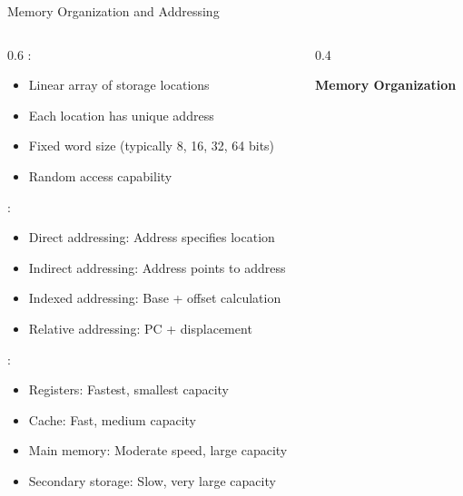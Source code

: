 \begin{frame}{Memory Organization and Addressing}
\begin{columns}
\begin{column}{0.6\textwidth}
:
\begin{itemize}
\item Linear array of storage locations
\item Each location has unique address
\item Fixed word size (typically 8, 16, 32, 64 bits)
\item Random access capability
\end{itemize}

\vspace{0.3cm}
:
\begin{itemize}
\item Direct addressing: Address specifies location
\item Indirect addressing: Address points to address
\item Indexed addressing: Base + offset calculation
\item Relative addressing: PC + displacement
\end{itemize}

\vspace{0.3cm}
:
\begin{itemize}
\item Registers: Fastest, smallest capacity
\item Cache: Fast, medium capacity
\item Main memory: Moderate speed, large capacity
\item Secondary storage: Slow, very large capacity
\end{itemize}
\end{column}
\begin{column}{0.4\textwidth}
\begin{center}
\textbf{Memory Organization}
\vspace{0.3cm}

\end{center}
\end{column}
\end{columns}
\end{frame}

